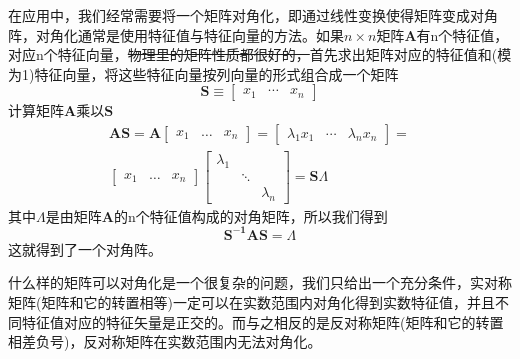 \documentclass[12pt,a4paper,openany,twoside]{book}
\numberwithin{equation}{section}
\begin{document}
    在应用中，我们经常需要将一个矩阵对角化，即通过线性变换使得矩阵变成对角阵，对角化通常是使用特征值与特征向量的方法。如果$n\times n$矩阵$\mathbf{A}$有n个特征值，对应n个特征向量，\sout{物理里的矩阵性质都很好的，}首先求出矩阵对应的特征值和(模为1)特征向量，将这些特征向量按列向量的形式组合成一个矩阵
    \begin{equation*}
      \mathbf{S}\equiv\left[ \begin{array}{lll}{x_{1}} & {\cdots} & {x_{n}}\end{array}\right]
    \end{equation*}
    计算矩阵$\mathbf{A}$乘以$\mathbf{S}$
    \begin{equation}
      \begin{aligned}
        \mathbf{A S}=\mathbf{A} \left[ \begin{array}{ccc}{x_{1}} & {\dots} & {x_{n}}\end{array}\right]=\left[ \begin{array}{lll}{\lambda_{1} x_{1}} & {\cdots} & {\lambda_{n} x_{n}}\end{array}\right]=\\ \left[ \begin{array}{ccc}{x_{1}} & {\dots} & {x_{n}}\end{array}\right] \left[ \begin{array}{ccc}{\lambda_{1}} & { } & { } \\ { } & {\ddots} & { } \\ { } & { } & {\lambda_{n}}\end{array}\right]=\mathbf{S }\Lambda
      \end{aligned}
    \end{equation}
    其中$\Lambda$是由矩阵$\mathbf{A}$的n个特征值构成的对角矩阵，所以我们得到
    \begin{equation}
      \mathbf{S^{-1}AS}=\Lambda
    \end{equation}
    这就得到了一个对角阵。

    什么样的矩阵可以对角化是一个很复杂的问题，我们只给出一个充分条件，实对称矩阵(矩阵和它的转置相等)一定可以在实数范围内对角化得到实数特征值，并且不同特征值对应的特征矢量是正交的。而与之相反的是反对称矩阵(矩阵和它的转置相差负号)，反对称矩阵在实数范围内无法对角化。
    
\end{document}
